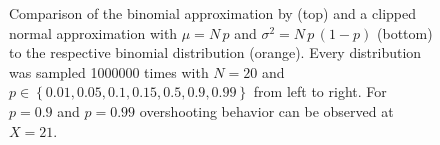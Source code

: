 \begin{figure}[!ht]
    \centering
    \resizebox*{1\textwidth}{!}{}
    \caption{Comparison of the binomial approximation by \textcite{deliot2023} (top) and a clipped normal approximation with $\mu=N\,p$ and $\sigma^2=N\,p\,(1-p)$ (bottom) to the respective binomial distribution (orange). Every distribution was sampled 1000000 times with $N=20$ and $p \in \left\{0.01, 0.05, 0.1, 0.15, 0.5, 0.9, 0.99\right\}$ from left to right. For $p=0.9$ and $p=0.99$ overshooting behavior can be observed at $X=21$. \label{fig:approximation}}
\end{figure}